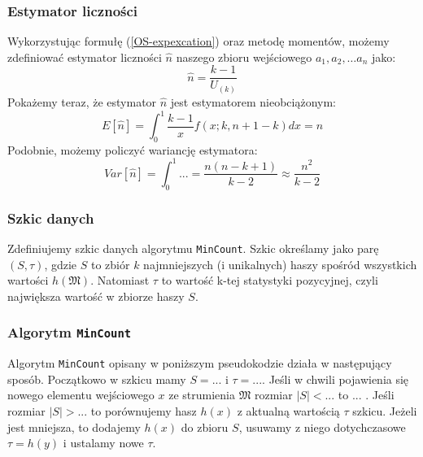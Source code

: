  \subsubsection*{Estymator liczności}
 
 Wykorzystując formułę (\ref{OS-expexcation}) oraz metodę momentów, możemy  zdefiniować estymator liczności $\hat{n}$ naszego zbioru wejściowego $a_1, a_2, \dots a_n$ jako:
\begin{equation}
    \hat{n} = \frac{k - 1}{U_{(k)}}
\end{equation}
Pokażemy teraz, że estymator $\hat{n}$ jest estymatorem nieobciążonym:
\begin{equation}
    E[\hat{n}] = \int_0^1 \frac{k - 1}{x}f(x; k, n+1-k) dx = n
\end{equation}
Podobnie, możemy policzyć wariancję estymatora:
\begin{equation}
    Var[\hat{n}] =   \int_0^1 ... 
    = \frac{n(n - k + 1)}{k - 2} \approx \frac{n^2}{k - 2}
\end{equation}

\subsubsection{Szkic danych}
Zdefiniujemy szkic danych algorytmu \texttt{MinCount}. Szkic określamy jako parę $(S, {\tau})$, gdzie $S$ to zbiór $k$ najmniejszych (i unikalnych) haszy spośród wszystkich wartości $h(\mathfrak{M})$. Natomiast ${\tau}$ to wartość k-tej statystyki pozycyjnej, czyli największa wartość w zbiorze haszy $S$.

\subsubsection{Algorytm \texttt{MinCount}}

Algorytm \texttt{MinCount} opisany w poniższym pseudokodzie działa w następujący sposób.
Początkowo w szkicu mamy $S=...$ i $\tau=...$.
Jeśli w chwili pojawienia się nowego elementu wejściowego $x$
 ze strumienia $\mathfrak{M}$ rozmiar $|S|< ...$ to ... .
 Jeśli rozmiar $|S|> ...$ to porównujemy hasz $h(x)$ z aktualną wartością  ${\tau}$ szkicu. Jeżeli jest mniejsza, to dodajemy $h(x)$ do zbioru $S$, usuwamy z niego dotychczasowe ${\tau}=h(y)$ i ustalamy nowe $\tau$. 

